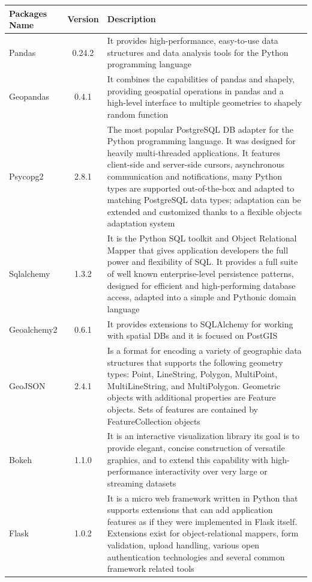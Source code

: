 \documentclass{article}
\begin{document}
\begin{longtable}[H]{|p{}|c|p{}|}
    \hline
    Packages Name & Version & Description \\    
    \hline
      Pandas  & 0.24.2    &   It provides high-performance, easy-to-use data structures and data analysis tools for the Python programming language
                \\
    \hline
      Geopandas & 0.4.1 &     It combines the capabilities of pandas and shapely, providing geospatial operations in pandas and a high-level interface to multiple geometries to shapely random function 
             \\
    \hline 
    Psycopg2 & 2.8.1 & The most popular PostgreSQL DB adapter for the Python programming language. It was designed for heavily multi-threaded applications. It features client-side and server-side cursors, asynchronous communication and notifications, many Python types are supported out-of-the-box and adapted to matching  PostgreSQL data types; adaptation can be extended and customized thanks to a flexible objects adaptation system
               \\
    \hline
    Sqlalchemy & 1.3.2 & It is the Python SQL toolkit and Object Relational Mapper that gives application developers the full power and flexibility of SQL. It provides a full suite of well known enterprise-level persistence patterns, designed for efficient and high-performing database access, adapted into a simple and Pythonic domain language
       \\
    \hline
    Geoalchemy2 & 0.6.1 & It provides extensions to SQLAlchemy for working with spatial DBs and it is focused on PostGIS
      \\
    \hline
    GeoJSON & 2.4.1 & Is a format for encoding a variety of geographic data structures that supports the following geometry types: Point, LineString, Polygon, MultiPoint, MultiLineString, and MultiPolygon. Geometric objects with additional properties are Feature objects. Sets of features are contained by FeatureCollection objects
       \\
    \hline
    Bokeh & 1.1.0 &  It is an interactive visualization library its goal is to provide elegant, concise construction of versatile graphics, and to extend this capability with high-performance interactivity over very large or streaming datasets
        \\
    \hline
    Flask & 1.0.2 & It is a micro web framework written in Python that supports extensions that can add application features as if they were implemented in Flask itself. Extensions exist for object-relational mappers, form validation, upload handling, various open authentication technologies and several common framework related tools \\

\end{longtable}
\end{document}
